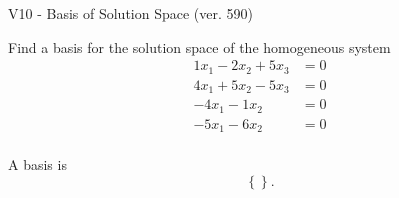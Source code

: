 \begin{exercise}
  \begin{exerciseTitle}V10 - Basis of Solution Space (ver. 590)\end{exerciseTitle}
  \begin{exerciseStatement}
    Find a basis for the solution space of the homogeneous system 
\begin{align*}
 1 x_ 1 -2 x_ 2 + 5 x_ 3 &= 0  \\ 
  4 x_ 1 + 5 x_ 2 -5 x_ 3 &= 0  \\ 
  -4 x_ 1 -1 x_ 2 &= 0  \\ 
  -5 x_ 1 -6 x_ 2 &= 0  \\ 
 \end{align*}


 
  \end{exerciseStatement}

  \begin{exerciseAnswer}
   A basis is   
\[\left\{\right\}.\]

  


  \end{exerciseAnswer}
\end{exercise}